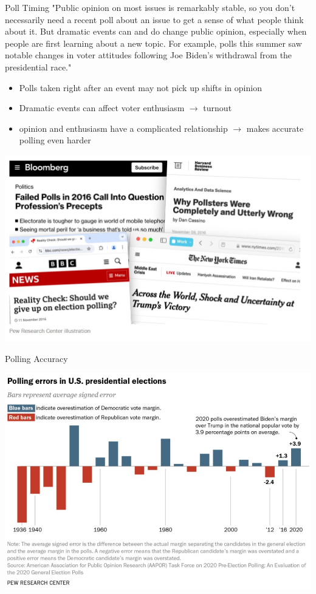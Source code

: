 \documentclass{beamer}
\begin{document}
\begin{frame}{Poll Timing}
"Public opinion on most issues is remarkably stable, so you don’t necessarily need a recent poll about an issue to get a sense of what people think about it. But dramatic events can and do change public opinion, especially when people are first learning about a new topic. For example, polls this summer saw notable changes in voter attitudes following Joe Biden’s withdrawal from the presidential race." \vspace{6mm}

\begin{itemize}
    \item Polls taken right after an event may not pick up shifts in opinion
    \item Dramatic events can affect voter enthusiasm $\rightarrow$ turnout
    \item opinion and enthusiasm have a complicated relationship $\rightarrow$ makes accurate polling even harder
\end{itemize}
\end{frame}

\begin{frame}
\includegraphics[scale=.7]{img/polling_headlines.jpg}    
\end{frame}

\begin{frame}{Polling Accuracy}
\begin{center}
    \includegraphics[scale=.7]{img/polling_accuracy.jpg}
\end{center}    
\end{frame}
\end{document}

